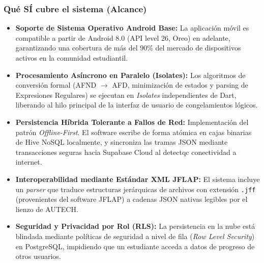 \subsubsection{Qué SÍ cubre el sistema (Alcance)}
\begin{itemize}
    \item \textbf{Soporte de Sistema Operativo Android Base:} La aplicación móvil es compatible a partir de Android 8.0 (API level 26, Oreo) en adelante, garantizando una cobertura de más del $90\%$ del mercado de dispositivos activos en la comunidad estudiantil.
    \item \textbf{Procesamiento Asíncrono en Paralelo (Isolates):} Los algoritmos de conversión formal (AFND $\rightarrow$ AFD, minimización de estados y parsing de Expresiones Regulares) se ejecutan en \textit{Isolates} independientes de Dart, liberando al hilo principal de la interfaz de usuario de congelamientos lógicos.
    \item \textbf{Persistencia Híbrida Tolerante a Fallos de Red:} Implementación del patrón \textit{Offline-First}. El software escribe de forma atómica en cajas binarias de Hive NoSQL localmente, y sincroniza las tramas JSON mediante transacciones seguras hacia Supabase Cloud al detectqc conectividad a internet.
    \item \textbf{Interoperabilidad mediante Estándar XML JFLAP:} El sistema incluye un \textit{parser} que traduce estructuras jerárquicas de archivos con extensión \texttt{.jff} (provenientes del software JFLAP) a cadenas JSON nativas legibles por el lienzo de AUTECH.
    \item \textbf{Seguridad y Privacidad por Rol (RLS):} La persistencia en la nube está blindada mediante políticas de seguridad a nivel de fila (\textit{Row Level Security}) en PostgreSQL, impidiendo que un estudiante acceda a datos de progreso de otros usuarios.
\end{itemize}

